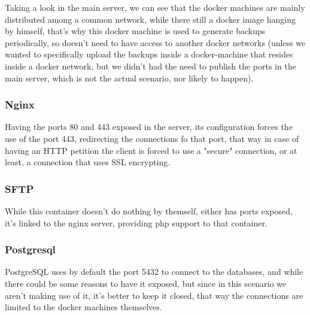 \documentclass[11pt]{article}
\begin{document}
    \begin{flushleft}
        Taking a look in the main server, we can see that the docker machines are mainly distributed among a common network,
        while there still a docker image hanging by himself, that's why this docker machine is used to generate backups
        periodically, so doesn't need to have access to another docker networks (unless we wanted to specifically upload
        the backups inside a docker-machine that resides inside a docker network, but we didn't had the need
        to publish the ports in the main server, which is not the actual scenario, nor likely to happen).
    \end{flushleft}

    \subsubsection[Nginx]{Nginx}
    \begin{flushleft}
        Having the ports 80 and 443 exposed in the server, its configuration forces the use of the port 443, redirecting
        the connections fo that port, that way in case of having an HTTP petition the client is forced to use a "secure"
        connection, or at least, a connection that uses SSL encrypting.
    \end{flushleft}

    \subsubsection[PHP]{SFTP}
    \begin{flushleft}
        While this container doesn't do nothing by themself, either has ports exposed, it's linked to the nginx server, providing php support
        to that container.
    \end{flushleft}

    \subsubsection[Postgresql]{Postgresql}
    \begin{flushleft}
        PostgreSQL uses by default the port 5432 to connect to the databases, and while there could be some reasons to
        have it exposed, but since in this scenario we aren't making use of it, it's better to keep it closed, that way
        the connections are limited to the docker machines themselves.
    \end{flushleft}
    \newpage
\end{document}
